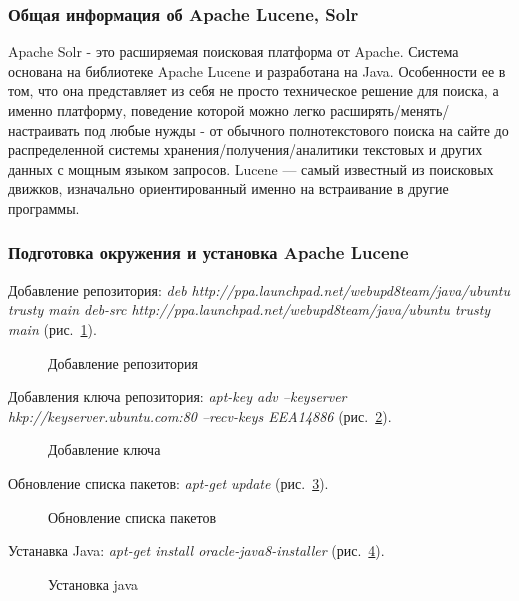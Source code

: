 \subsubsection{Общая информация об Apache Lucene, Solr}

Apache Solr - это расширяемая поисковая платформа от Apache. Система основана на библиотеке Apache Lucene и разработана на Java. Особенности ее в том, что она представляет из себя не просто техническое решение для поиска, а именно платформу, поведение которой можно легко расширять/менять/настраивать под любые нужды - от обычного полнотекстового поиска на сайте до распределенной системы хранения/получения/аналитики текстовых и других данных с мощным языком запросов. Lucene — самый известный из поисковых движков, изначально ориентированный именно на встраивание в другие программы.

\subsubsection{Подготовка окружения и установка Apache Lucene}
Добавление репозитория:
\textit
{
deb http://ppa.launchpad.net/webupd8team/java/ubuntu trusty main
deb-src http://ppa.launchpad.net/webupd8team/java/ubuntu trusty main
} (рис.~\ref{ship_9:ship_9}).

\begin{figure}[h!]
\caption{Добавление репозитория}
\label{ship_9:ship_9}
\end{figure}

Добавления ключа репозитория:
  \textit{
apt-key adv --keyserver hkp://keyserver.ubuntu.com:80 --recv-keys EEA14886
} (рис.~\ref{ship_10:ship_10}).

\begin{figure}[h!]
\caption{Добавление ключа}
\label{ship_10:ship_10}
\end{figure}

Обновление списка пакетов:
\textit
{
apt-get update
} (рис.~\ref{ship_11:ship_11}).

\begin{figure}[h!]
\caption{Обновление списка пакетов}
\label{ship_11:ship_11}
\end{figure}

Устанавка Java:
\textit
{
apt-get install oracle-java8-installer
} (рис.~\ref{ship_12:ship_12}).

\begin{figure}[h!]
\caption{Установка java}
\label{ship_12:ship_12}
\end{figure}

